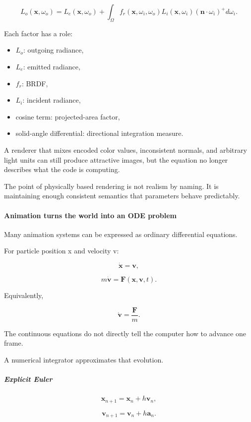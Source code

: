 \[
L_o(\mathbf x,\omega_o)
=
L_e(\mathbf x,\omega_o)
+
\int_{\Omega}
f_r(\mathbf x,\omega_i,\omega_o)
L_i(\mathbf x,\omega_i)
(\mathbf n\cdot\omega_i)^+
d\omega_i.
\]

Each factor has a role:

\begin{itemize}
\tightlist
\item
  \(L_o\): outgoing radiance,
\item
  \(L_e\): emitted radiance,
\item
  \(f_r\): BRDF,
\item
  \(L_i\): incident radiance,
\item
  cosine term: projected-area factor,
\item
  solid-angle differential: directional integration measure.
\end{itemize}

A renderer that mixes encoded color values, inconsistent normals, and arbitrary light units can still produce attractive images, but the equation no longer describes what the code is computing.

The point of physically based rendering is not realism by naming. It is maintaining enough consistent semantics that parameters behave predictably.

\paragraph{Animation turns the world into an ODE problem}\label{animation-turns-the-world-into-an-ode-problem}

Many animation systems can be expressed as ordinary differential equations.

For particle position x and velocity v:

\[
\dot{\mathbf x}=\mathbf v,
\]

\[
m\dot{\mathbf v}=\mathbf F(\mathbf x,\mathbf v,t).
\]

Equivalently,

\[
\dot{\mathbf v}
=
\frac{\mathbf F}{m}.
\]

The continuous equations do not directly tell the computer how to advance one frame.

A numerical integrator approximates that evolution.

\subparagraph{Explicit Euler}\label{explicit-euler}

\[
\mathbf x_{n+1}
=
\mathbf x_n+h\mathbf v_n,
\]

\[
\mathbf v_{n+1}
=
\mathbf v_n+h\mathbf a_n.
\]

